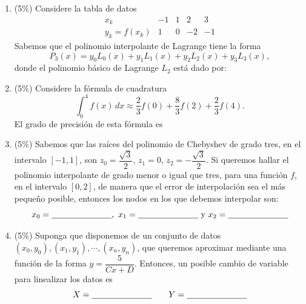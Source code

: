 \documentclass[11pt]{article}
\begin{document}
\begin{enumerate}
\item[(a)] (5\%) Considere la tabla de datos
\[
\begin{array}{c|c|c|c|c}
x_k & -1 & 1 & 2 & 3\\ \hline
y_k=f(x_k) & 1 & 0 & -2 & -1
\end{array}
\]
Sabemos que el polinomio interpolante de Lagrange tiene la forma
\[
P_3(x)=y_0L_0(x)+y_1L_1(x)+y_2L_2(x)+y_3L_3(x),
\]
donde el polinomio básico de Lagrange $L_2$ está dado por:

\item[(b)] (5\%) Considere la fórmula de cuadratura
\[
\int_0^4 f(x)\,dx\approx\frac23f(0)+\frac83f(2)+\frac23f(4).
\]
El grado de precisión de esta fórmula es

\item[(c)] (5\%) Sabemos que las raíces del polinomio de Chebyshev de grado tres, en el intervalo $[-1,1]$, son $z_0=\dfrac{\sqrt3}2$, $z_1=0$, $z_2=-\dfrac{\sqrt3}2$. Si queremos hallar el polinomio interpolante de grado menor o igual que tres, para una función $f$, en el intervalo $[0,2]$, de manera que el error de interpolación sea el más pequeño posible, entonces los nodos en los que debemos interpolar son:
\[
x_0=\underline{\hspace{2.5cm}},\ x_1=\underline{\hspace{2.5cm}} \ \text{y}\ x_2=\underline{\hspace{2.5cm}}
\]

\item[(d)] (5\%) Suponga que disponemos de un conjunto de datos $(x_0,y_0),(x_1,y_1),\cdots,(x_n,y_n)$, que queremos aproximar mediante una función de la forma $y=\dfrac5{Cx+D}$. Entonces, un posible cambio de variable para linealizar los datos es
\[
X=\underline{\hspace{2.5cm}} \qquad Y=\underline{\hspace{2.5cm}}
\]
\end{enumerate}
\end{document}
